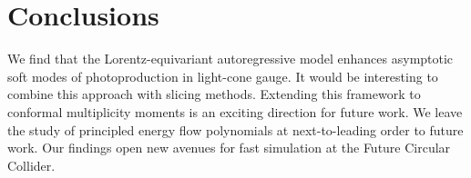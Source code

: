 \section{Conclusions}\label{sec:conclusions}

We find that the Lorentz-equivariant autoregressive model enhances
asymptotic soft modes of photoproduction in light-cone gauge. It would
be interesting to combine this approach with slicing methods. Extending
this framework to conformal multiplicity moments is an exciting
direction for future work. We leave the study of principled energy flow
polynomials at next-to-leading order to future work. Our findings open
new avenues for fast simulation at the Future Circular Collider.


